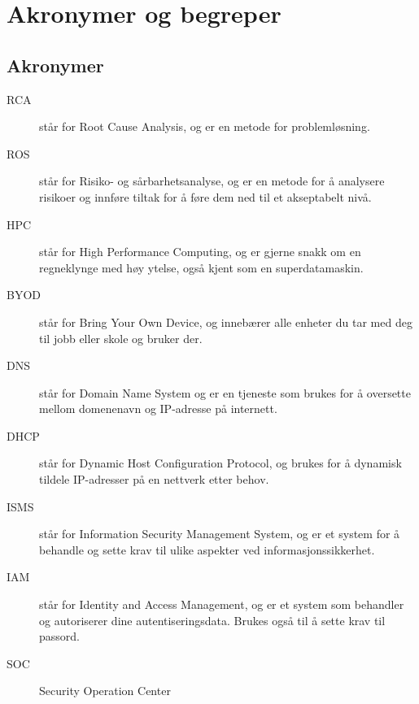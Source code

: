 \chapter*{Akronymer og begreper}
\label{kap:akronymer}

\section*{Akronymer}
\begin{description}
    \item[RCA] står for Root Cause Analysis, og er en metode for problemløsning.
    \item[ROS] står for Risiko- og sårbarhetsanalyse, og er en metode for å analysere risikoer og innføre tiltak for å føre dem ned til et akseptabelt nivå.
    \item[HPC] står for High Performance Computing, og er gjerne snakk om en regneklynge med høy ytelse, også kjent som en superdatamaskin.
    \item[BYOD] står for Bring Your Own Device, og innebærer alle enheter du tar med deg til jobb eller skole og bruker der.
    \item[DNS] står for Domain Name System og er en tjeneste som brukes for å oversette mellom domenenavn og IP-adresse på internett.
    \item[DHCP] står for Dynamic Host Configuration Protocol, og brukes for å dynamisk tildele IP-adresser på en nettverk etter behov.
    \item[ISMS] står for Information Security Management System, og er et system for å behandle og sette krav til ulike aspekter ved informasjonssikkerhet.
    \item[IAM] står for Identity and Access Management, og er et system som behandler og autoriserer dine autentiseringsdata. Brukes også til å sette krav til passord. 
    \item[SOC] Security Operation Center
\end{description}


